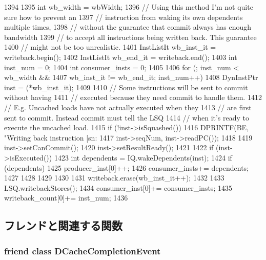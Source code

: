 \begin{DoxyCode}
1394 {
1395     int wb_width = wbWidth;
1396     // Using this method I'm not quite sure how to prevent an
1397     // instruction from waking its own dependents multiple times,
1398     // without the guarantee that commit always has enough bandwidth
1399     // to accept all instructions being written back.  This guarantee
1400     // might not be too unrealistic.
1401     InstListIt wb_inst_it = writeback.begin();
1402     InstListIt wb_end_it = writeback.end();
1403     int inst_num = 0;
1404     int consumer_insts = 0;
1405 
1406     for (; inst_num < wb_width &&
1407              wb_inst_it != wb_end_it; inst_num++) {
1408         DynInstPtr inst = (*wb_inst_it);
1409 
1410         // Some instructions will be sent to commit without having
1411         // executed because they need commit to handle them.
1412         // E.g. Uncached loads have not actually executed when they
1413         // are first sent to commit.  Instead commit must tell the LSQ
1414         // when it's ready to execute the uncached load.
1415         if (!inst->isSquashed()) {
1416             DPRINTF(BE, "Writing back instruction [sn:%
1417                     inst->seqNum, inst->readPC());
1418 
1419             inst->setCanCommit();
1420             inst->setResultReady();
1421 
1422             if (inst->isExecuted()) {
1423                 int dependents = IQ.wakeDependents(inst);
1424                 if (dependents) {
1425                     producer_inst[0]++;
1426                     consumer_insts+= dependents;
1427                 }
1428             }
1429         }
1430 
1431         writeback.erase(wb_inst_it++);
1432     }
1433     LSQ.writebackStores();
1434     consumer_inst[0]+= consumer_insts;
1435     writeback_count[0]+= inst_num;
1436 }
\end{DoxyCode}


\subsection{フレンドと関連する関数}
\hypertarget{classBackEnd_a27227be5511e316f17702a3a99fb0b98}{
\subsubsection[{DCacheCompletionEvent}]{\setlength{\rightskip}{0pt plus 5cm}friend class {\bf DCacheCompletionEvent}}}
\label{classBackEnd_a27227be5511e316f17702a3a99fb0b98}



